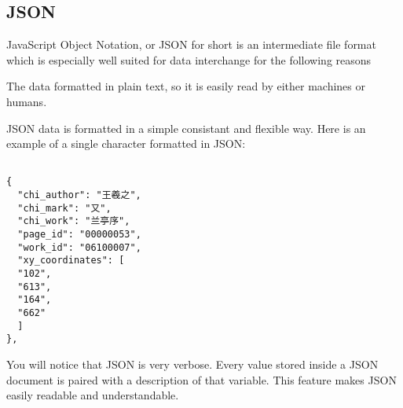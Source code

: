 \subsection{JSON}

JavaScript Object Notation, or JSON for short is an intermediate file format which is especially well suited for data interchange for the following reasons

The data formatted in plain text, so it is easily read by either machines or humans.

JSON data is formatted in a simple consistant and flexible way.  Here is an example of a single character formatted in JSON:

\begin{verbatim}
    
{
  "chi_author": "王羲之",
  "chi_mark": "又",
  "chi_work": "兰亭序",
  "page_id": "00000053",
  "work_id": "06100007",
  "xy_coordinates": [
  "102",
  "613",
  "164",
  "662"
  ]
},
\end{verbatim}


You will notice that JSON is very verbose.  Every value stored inside a JSON document is paired with a description of that variable.  This feature makes JSON easily readable and understandable.


